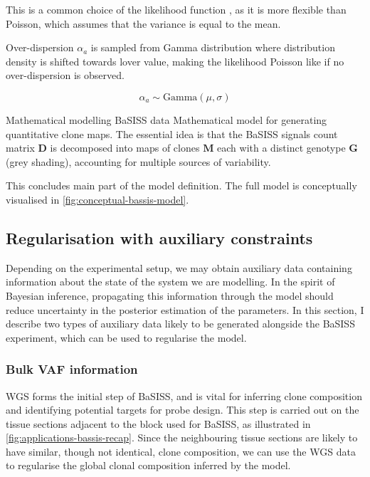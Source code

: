 This is a common choice of the likelihood function \parencite{Kleshchevnikov2022-ub, Townes2023-uj}, as it is more flexible than Poisson, which assumes that the variance is equal to the mean.

Over-dispersion $\alpha_a$ is sampled from Gamma distribution where distribution density is shifted towards lover value, making the likelihood Poisson like if no over-dispersion is observed.

\begin{equation}
    {\alpha}_a \sim \mathrm{Gamma}(\mu, \sigma)
\end{equation} 

    {Mathematical modelling \acs{BaSISS} data}
    {Mathematical model for generating quantitative clone maps. The essential idea is that the \ac{BaSISS} signals count matrix $\mathbf{D}$ is decomposed into maps of clones $\mathbf{M}$ each with
    a distinct genotype $\mathbf{G}$ (grey shading), accounting for multiple sources of variability.}


This concludes main part of the model definition. The full model is conceptually visualised in \cref{fig:conceptual-bassis-model}.

\subsection{Regularisation with auxiliary constraints}
Depending on the experimental setup, we may obtain auxiliary data containing information about the state of the system we are modelling. In the spirit of Bayesian inference, propagating this information through the model should reduce uncertainty in the posterior estimation of the parameters. In this section, I describe two types of auxiliary data likely to be generated alongside the \ac{BaSISS} experiment, which can be used to regularise the model.

\subsubsection*{Bulk \acl{VAF} information}

\ac{WGS} forms the initial step of \ac{BaSISS}, and is vital for inferring clone composition and identifying potential targets for probe design. This step is carried out on the tissue sections adjacent to the block used for \ac{BaSISS}, as illustrated in \cref{fig:applications-bassis-recap}. Since the neighbouring tissue sections are likely to have similar, though not identical, clone composition, we can use the \ac{WGS} data to regularise the global clonal composition inferred by the model.

